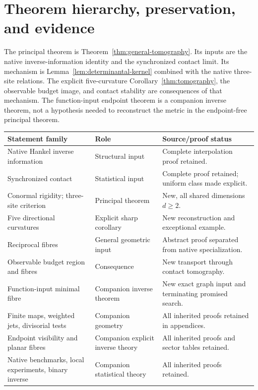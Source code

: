 \section{Theorem hierarchy, preservation, and evidence}\label{app:dependencies}
The principal theorem is Theorem~\ref{thm:general-tomography}. Its inputs are the native inverse-information identity and the synchronized contact limit. Its mechanism is Lemma~\ref{lem:determinantal-kernel} combined with the native three-site relations. The explicit five-curvature Corollary~\ref{thm:tomography}, the observable budget image, and contact stability are consequences of that mechanism. The function-input endpoint theorem is a companion inverse theorem, not a hypothesis needed to reconstruct the metric in the endpoint-free principal theorem.

\begin{center}\small
\begin{tabular}{@{}p{}p{}p{}@{}}
\toprule
Statement family & Role & Source/proof status \\
\midrule
Native Hankel inverse information & Structural input & Complete interpolation proof retained. \\
Synchronized contact & Statistical input & Complete proof retained; uniform class made explicit. \\
Conormal rigidity; three-site criterion & Principal theorem & New, all shared dimensions $d\ge2$. \\
Five directional curvatures & Explicit sharp corollary & New reconstruction and exceptional example. \\
Reciprocal fibres & General geometric input & Abstract proof separated from native specialization. \\
Observable budget region and fibres & Consequence & New transport through contact tomography. \\
Function-input minimal fibre & Companion inverse theorem & New exact graph input and terminating promised search. \\
Finite maps, weighted jets, divisorial tests & Companion geometry & All inherited proofs retained in appendices. \\
Endpoint visibility and planar fibres & Companion explicit inverse theory & All inherited proofs and sector tables retained. \\
Native benchmarks, local experiments, binary inverse & Companion statistical theory & All inherited proofs retained. \\
\bottomrule
\end{tabular}
\end{center}

